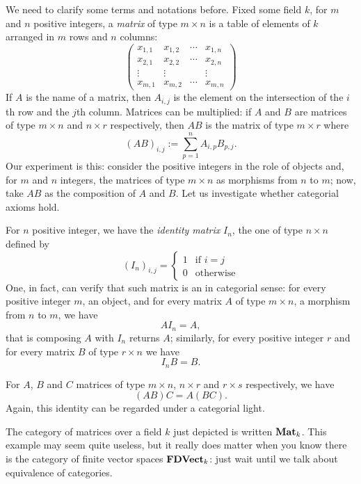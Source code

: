 \begin{example}[Matrices]
We need to clarify some terms and notations before. Fixed some field \(k\), for \(m\) and \(n\) positive integers, a {\em matrix} of type \(m \times n\) is a table of elements of \(k\) arranged in \(m\) rows and \(n\) columns:
\[\begin{pmatrix}
x_{1,1} & x_{1,2} & \cdots{} & x_{1,n} \\
x_{2,1} & x_{2,2} & \cdots{} & x_{2,n} \\
\vdots  & \vdots  &          & \vdots  \\
x_{m,1} & x_{m,2} & \cdots{} & x_{m,n}
\end{pmatrix}\]
If \(A\) is the name of a matrix, then \(A_{i, j}\) is the element on the intersection of the \(i\)th row and the \(j\)th column. Matrices can be multiplied: if \(A\) and \(B\) are matrices of type \(m \times n\) and \(n \times r\) respectively, then \(AB\) is the matrix of type \(m \times r\) where
\[(AB)_{i, j} := \sum_{p = 1}^n A_{i, p} B_{p ,j} .\]
Our experiment is this: consider the positive integers in the role of objects and, for \(m\) and \(n\) integers, the matrices of type \(m \times n\) as morphisms from \(n\) to \(m\); now, take \(AB\) as the composition of \(A\) and \(B\). Let us investigate whether categorial axioms hold.
\begin{tcbitem}
\item For \(n\) positive integer, we have the {\em identity matrix} \(I_n\), the one of type \(n \times n\) defined by
\[(I_n)_{i, j} = \begin{cases}
1 & \text{if } i = j \\
0 & \text{otherwise}
\end{cases}\]
One, in fact, can verify that such matrix is an  in categorial sense: for every positive integer \(m\), an object, and for every matrix \(A\) of type \(m \times n\), a morphism from \(n\) to \(m\), we have
\[A I_n = A ,\]
that is composing \(A\) with \(I_n\) returns \(A\); similarly, for every positive integer \(r\) and for every matrix \(B\) of type \(r \times n\) we have
\[I_n B = B .\]
\item For \(A\), \(B\) and \(C\) matrices of type \(m \times n\), \(n \times r\) and \(r \times s\) respectively, we have
\[(AB)C = A(BC) .\]
Again, this identity can be regarded under a categorial light.
\end{tcbitem}
The category of matrices over a field \(k\) just depicted is written \(\mathbf{Mat}_k\). This example may seem quite useless, but it really does matter when you know there is the category of finite vector spaces \(\mathbf{FDVect}_k\): just wait until we talk about equivalence of categories. 
\end{example}


